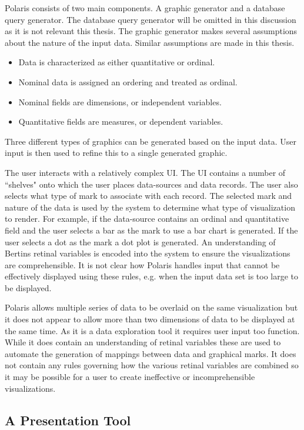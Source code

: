 \documentclass[a4paper, 11pt, titlepage, onehalfspacing]{report}
\begin{document}
Polaris consists of two main components. A graphic generator and a database query generator. The database query generator will be omitted in this discussion as it is not relevant this thesis. The graphic generator makes several assumptions about the nature of the input data. Similar assumptions are made in this thesis. 
\begin{itemize} 
\item Data is characterized as either quantitative or ordinal.
\item Nominal data is assigned an ordering and treated as ordinal.
\item Nominal fields are dimensions, or independent variables.
\item Quantitative fields are measures, or dependent variables.
\end{itemize}
 Three different types of graphics can be generated based on the input data. User input is then used to refine this to a 
single generated graphic.


The user interacts with a relatively complex UI. The UI contains a number of ``shelves" onto which the user places data-sources and data records. The user also selects what type of mark to associate with each record. The selected mark and nature of the data is used by the system to determine what type of visualization to render. For example, if the data-source contains an ordinal and quantitative field and the user selects a bar as the mark to use a bar chart is generated. If the user selects a dot as the mark a dot plot is generated. An understanding of Bertins retinal variables \cite{bertin1973semiologie} is encoded into the system to ensure the visualizations are comprehensible. It is not clear how Polaris handles input that cannot be effectively displayed using these rules, e.g. when the input data set is too large to be displayed.

Polaris allows multiple series of data to be overlaid on the same visualization but it does not appear to allow more than two dimensions of data to be displayed at the same time. As it is a data exploration tool it requires user input too function. While it does contain an understanding of retinal variables these are used to automate the generation of mappings between data and graphical marks. It does not contain any rules governing how the various retinal variables are combined so it may be possible for a user to create ineffective or incomprehensible visualizations.

		\subsection{A Presentation Tool}
\end{document}
